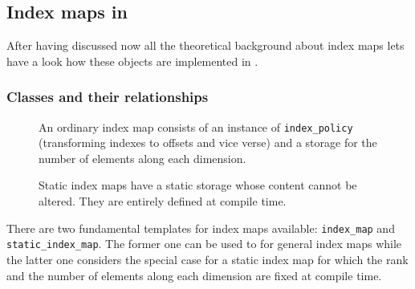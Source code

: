 \subsection{Index maps in \libpnicore}

After having discussed now all the theoretical background about index maps lets
have a look how these objects are implemented in \libpnicore.

\subsubsection{Classes and their relationships}

\begin{figure}[tb]
\centering
\begin{minipage}[c]{0.49\linewidth}
\centering
{}
\caption{{\small\label{fig:array_app:index_map_diagram}
An ordinary index map consists of an instance of \texttt{index\_policy}
(transforming indexes to offsets and vice verse) and a
storage for the number of elements along each dimension. 
}}
\end{minipage}
\hfill
\begin{minipage}[c]{0.49\linewidth}
\centering
{}
\caption{{\small\label{fig:array_app:static_index_map_diagram}
Static index maps have a static storage whose content cannot be altered. They
are entirely defined at compile time.
}}
\end{minipage}
\end{figure}
There are two fundamental templates for index maps available: \texttt{index\_map}
and \texttt{static\_index\_map}. The former one can be used to for general index
maps while the latter one considers the special case for a static index map
for which the rank and the number of elements along each dimension are fixed at
compile time. 

